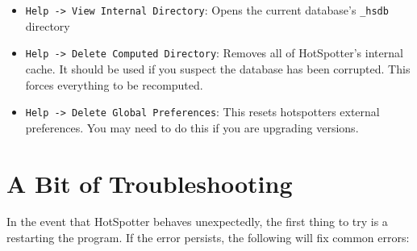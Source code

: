 \documentclass[a4paper,10pt]{article}
\begin{document}
\begin{itemize}
\item \verb+Help -> View Internal Directory+: 
    Opens the current database's {\tt \_hsdb} directory

\item \verb+Help -> Delete Computed Directory+: 
    Removes all of HotSpotter's internal cache. It should be used if you suspect
    the database has been corrupted. This forces everything to be recomputed. 

\item \verb+Help -> Delete Global Preferences+: 
    This resets hotspotters external preferences. You may need to do this if you
    are upgrading versions. 



\end{itemize}
  


\section{A Bit of Troubleshooting}

In the event that HotSpotter behaves unexpectedly, the first thing to try is a
restarting the program. If the error persists, the following will fix common
errors: 
\end{document}
